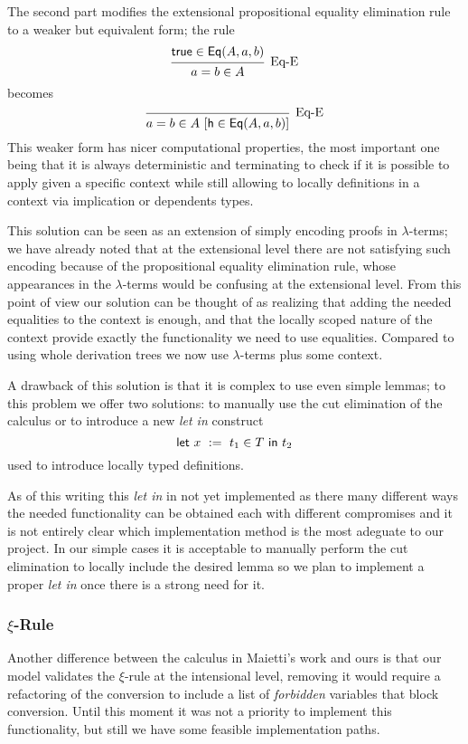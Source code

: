 	The second part modifies the extensional propositional equality elimination rule to a weaker but equivalent form; the rule
	\[
	\begin{prooftree}
	\hypo{\s{true}\in \s{Eq}(A,a,b)}
	\infer1[Eq-E]{a = b \in A}
	\end{prooftree}
	\]
	becomes
	\[
	\begin{prooftree}
	\infer0[Eq-E]{a = b \in A\ [{\s{h}\in \s{Eq}(A,a,b)}]}
	\end{prooftree}
	\]	
	This weaker form has nicer computational properties, the most important one being that it is always deterministic and terminating to check if it is possible to apply given a specific context while still allowing to locally definitions in a context via implication or dependents types. 
	
	This solution can be seen as an extension of simply encoding proofs in $\lambda$-terms; we have already noted that at the extensional level there are not satisfying such encoding because of the propositional equality elimination rule, whose appearances in the $\lambda$-terms would be confusing at the extensional level. From this point of view our solution can be thought of as realizing that adding the needed equalities to the context is enough, and that the locally scoped nature of the context provide exactly the functionality we need to use equalities. Compared to using whole derivation trees we now use $\lambda$-terms plus some context.
	
	A drawback of this solution is that it is complex to use even simple lemmas; to this problem we offer two solutions: to manually use the cut elimination of the calculus or to introduce a new \emph{let in} construct \[\s{let}\ x\ :=\ t_1 \in T\ \s{in}\ t_2\] used to introduce locally typed definitions.
	
	As of this writing this \emph{let in} in not yet implemented as there many different ways the needed functionality can be obtained each with different compromises and it is not entirely clear which implementation method is the most adeguate to our project. In our simple cases it is acceptable to manually perform the cut elimination to locally include the desired lemma so we plan to implement a proper \emph{let in} once there is a strong need for it.
	
	\subsubsection{$\xi$-Rule}
	Another difference between the calculus in Maietti's work and ours is that our model validates the $\xi$-rule at the intensional level, removing it would require a refactoring of the conversion to include a list of \emph{forbidden} variables that block conversion. Until this moment it was not a priority to implement this functionality, but still we have some feasible implementation paths.